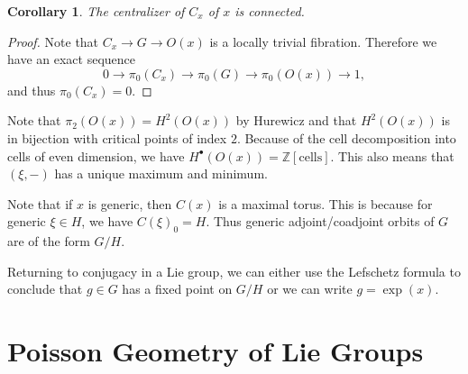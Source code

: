 \documentclass[leqno, openany]{memoir}
\newtheorem{cor}[thm]{Corollary}
\theoremstyle{definition}
\theoremstyle{remark}
\theoremstyle{plain}
\theoremstyle{definition}
\theoremstyle{remark}
\newcommand{\Z}{\mathbb{Z}}
\begin{document}
\begin{cor}
    The centralizer of $C_x$ of $x$ is connected.
\end{cor}

\begin{proof}
    Note that $C_x \to G \to O(x)$ is a locally trivial fibration. Therefore we have an exact sequence
    \[ 0 \to \pi_0(C_x) \to \pi_0(G) \to \pi_0(O(x)) \to 1, \]
    and thus $\pi_0(C_x) = 0$.
\end{proof}

Note that $\pi_2(O(x)) = H^2(O(x))$ by Hurewicz and that $H^2(O(x))$ is in bijection with critical points of index $2$. Because of the cell decomposition into cells of even dimension, we have $H^{\bullet}(O(x)) = \Z[\text{cells}]$. This also means that $(\xi, -)$ has a unique maximum and minimum.

Note that if $x$ is generic, then $C(x)$ is a maximal torus. This is because for generic $\xi \in H$, we have $C(\xi)_0 = H$. Thus generic adjoint/coadjoint orbits of $G$ are of the form $G/H$.

Returning to conjugacy in a Lie group, we can either use the Lefschetz formula to conclude that $g \in G$ has a fixed point on $G/H$ or we can write $g = \exp(x)$.

\section{Poisson Geometry of Lie Groups}%
\label{sec:geometry_of_lie_groups}
\end{document}

